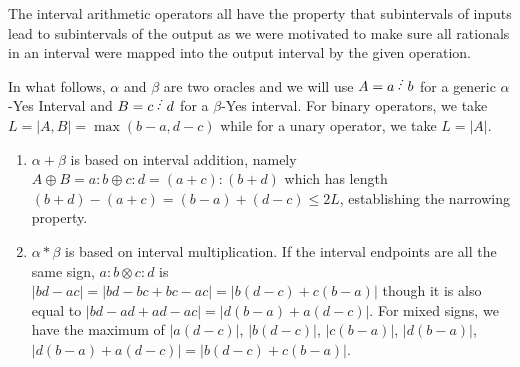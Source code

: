 \documentclass[12pt]{article}
\begin{document}
The interval arithmetic operators all have the property that subintervals of inputs lead to subintervals of the output as we were motivated to make sure all rationals in an interval were mapped into the output interval by the given operation. 

In what follows, $\alpha$ and $\beta$ are two oracles and we will use $A=a\lte b$ for a generic $\alpha$-Yes Interval and $B=c\lte d$ for  a $\beta$-Yes interval. For binary operators, we take $L = |A,B| = \max(b-a, d-c)$ while for a unary operator, we take $L = |A|$. 


\begin{enumerate}
    \item $\alpha+\beta$ is based on interval addition, namely $A \oplus B = a:b \oplus c:d = (a+c):(b+d)$ which has length $(b+d) - (a+c) = (b-a) + (d-c) \leq 2L$, establishing the narrowing property. 
    \item $\alpha * \beta$ is based on interval multiplication. If the interval endpoints are all the same sign, $a:b \otimes c:d$ is $|bd-ac| = |bd -bc + bc -ac| =  |b(d-c) + c(b-a)|$ though it is also equal to $|bd - ad + ad - ac| = |d(b-a) + a(d-c)|$. For mixed signs, we have the maximum of $|a(d-c)|$, $|b(d-c)|$, $|c(b-a)|$, $|d(b-a)|$, $|d(b-a)+a(d-c)| = |b(d-c) + c(b-a)|$. 
    

\end{enumerate}
\end{document}
